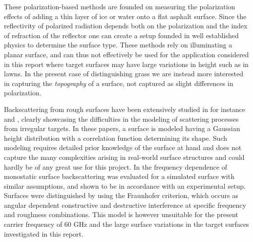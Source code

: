 These polarization-based methods are founded on measuring the polarization effects of adding a thin layer of ice or water onto a flat asphalt surface. Since the reflectivity of polarized radiation depends both on the polarization and the index of refraction of the reflector one can create a setup founded in well established physics to determine the surface type. These methods rely on illuminating a planar surface, and can thus not effectively be used for the application considered in this report where target surfaces may have large variations in height such as in lawns. In the present case of distinguishing grass we are instead more interested in capturing the \emph{topography} of a surface, not captured as slight differences in polarization.

Backscattering from rough surfaces have been extensively studied in for instance \citep{fung_pan_1987} and \citep{fung_li_chen_1992}, clearly showcasing the difficulties in the modeling of scattering processes from irregular targets. In these papers, a surface is modeled having a Gaussian height distribution with a correlation function determining its shape. Such modeling requires detailed prior knowledge of the surface at hand and does not capture the many complexities arising in real-world surface structures and could hardly be of any great use for this project. In \citep{scharf_iberle_mantz_walter_waldschrnidt_2018} the frequency dependence of monostatic surface backscattering was evaluated for a simulated surface with similar assumptions, and shown to be in accordance with an experimental setup. Surfaces were distinguished by using the Fraunhofer criterion, which occurs as angular dependent constructive and destructive interference at specific frequency and roughness combinations. This model is however unsuitable for the present carrier frequency of 60 GHz and the large surface variations in the target surfaces investigated in this report.

